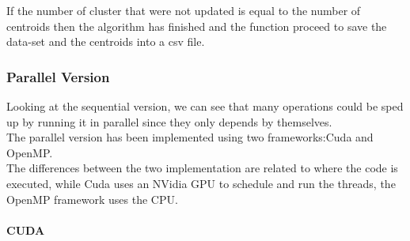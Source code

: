 \documentclass[10pt,twocolumn,letterpaper]{article}
\newcommand{\nlparagraph}[1]{\paragraph{#1}\mbox{}\\}
\begin{document}
If the number of cluster that were not updated is equal to the number of centroids then the algorithm has finished and the function
proceed to save the data-set and the centroids into a csv file.

\subsubsection{Parallel Version}
Looking at the sequential version, we can see that many operations could be sped up by running it in parallel since they only depends by
themselves.\\
The parallel version has been implemented using two frameworks:Cuda and OpenMP.\\
The differences between the two implementation are related to where the code is executed, while Cuda uses an NVidia GPU to 
schedule and run the threads, the OpenMP framework uses the CPU.\\
\nlparagraph{CUDA}
\end{document}
